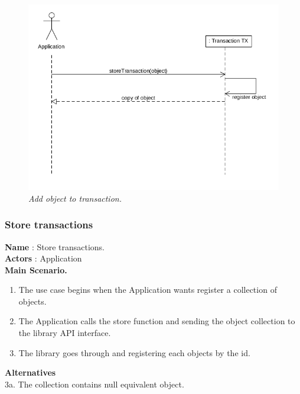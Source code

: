 \documentclass[12pt]{article}
\begin{document}
{\begin{figure}[h!]
\centering
\includegraphics[scale=0.5]{Pictures/store.png}
\caption{\textit{\color{gray}Add object to transaction.}}
\end{figure}

\subsubsection{Store transactions}
\textbf{Name} : Store transactions.\\
\textbf{Actors} : Application\\
\textbf{Main Scenario.}
\begin{enumerate}
  \item The use case begins when the Application wants register a collection of objects.
 \item The Application calls the store function and sending the object collection to the library API interface.
  \item The library goes  through and registering each objects by the id.
\end{enumerate}
\textbf{Alternatives}\\
3a. The collection contains null equivalent object.\\


}
\end{document}

